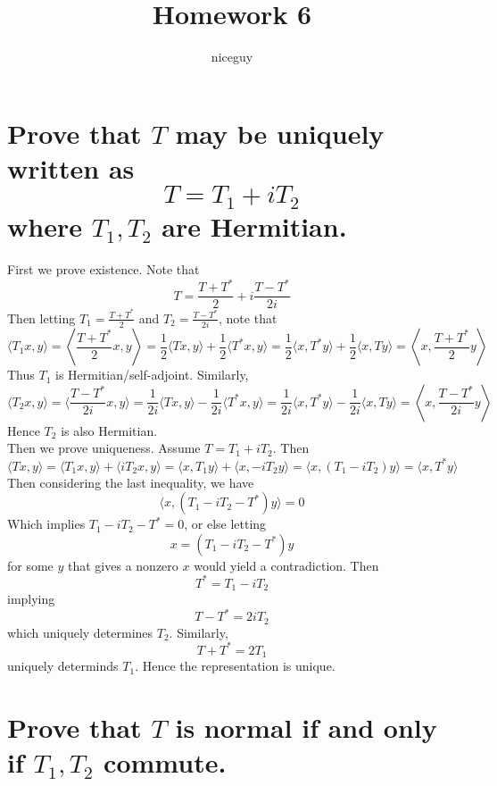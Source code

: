 \documentclass[answers]{exam}
\author{niceguy}
\title{Homework 6}
\begin{document}
\maketitle

\begin{questions}


\begin{parts}
	\part{Prove that $T$ may be uniquely written as
		$$T = T_1 + iT_2$$
	where $T_1,T_2$ are Hermitian.}
	\begin{solution}
		First we prove existence. Note that
		$$T = \frac{T+T^*}{2} + i\frac{T-T^*}{2i}$$
		Then letting $T_1 = \frac{T+T^*}{2}$ and $T_2 = \frac{T-T^*}{2i}$, note that
		$$\langle T_1x,y \rangle = \left\langle \frac{T+T^*}{2}x,y \right\rangle = \frac{1}{2}\langle Tx,y \rangle + \frac{1}{2} \langle T^*x,y \rangle = \frac{1}{2} \langle x,T^*y \rangle + \frac{1}{2} \langle x,Ty \rangle = \left\langle x,\frac{T+T^*}{2}y \right\rangle$$
		Thus $T_1$ is Hermitian/self-adjoint. Similarly,
		$$\langle T_2x,y \rangle = \langle \frac{T-T^*}{2i}x,y \rangle = \frac{1}{2i} \langle Tx,y \rangle - \frac{1}{2i} \langle T^*x,y \rangle = \frac{1}{2i} \langle x,T^*y \rangle - \frac{1}{2i} \langle x,Ty \rangle = \left\langle x,\frac{T-T^*}{2i}y \right\rangle$$
		Hence $T_2$ is also Hermitian. \\
		Then we prove uniqueness. Assume $T=T_1 + iT_2$. Then
		$$\langle Tx,y \rangle = \langle T_1x,y \rangle + \langle iT_2x,y \rangle = \langle x,T_1y \rangle + \langle x,-iT_2y \rangle = \langle x,(T_1-iT_2)y \rangle = \langle x,T^*y \rangle$$
		Then considering the last inequality, we have
		$$\langle x,(T_1-iT_2-T^*)y \rangle = 0$$
		Which implies $T_1-iT_2-T^*=0$, or else letting
		$$x = (T_1-iT_2-T^*)y$$
		for some $y$ that gives a nonzero $x$ would yield a contradiction. Then
		$$T^* = T_1 - iT_2$$
		implying
		$$T-T^* = 2iT_2$$
		which uniquely determines $T_2$. Similarly,
		$$T+T^* = 2T_1$$
		uniquely determinds $T_1$. Hence the representation is unique.
	\end{solution}

	\part{Prove that $T$ is normal if and only if $T_1,T_2$ commute.}


\end{parts}
\end{questions}
\end{document}
